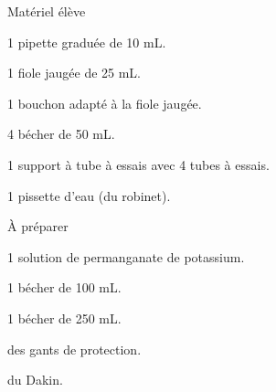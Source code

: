 
\begin{boiteMateriel}{Matériel élève}
  \effectifSeconde

  \begin{protocole}
    \item 1 pipette graduée de 10 mL.
    \item 1 fiole jaugée de 25 mL.
    \item 1 bouchon adapté à la fiole jaugée.
    \item 4 bécher de 50 mL.
    \item 1 support à tube à essais avec 4 tubes à essais.
    \item 1 pissette d'eau (du robinet).
  \end{protocole}
\end{boiteMateriel}


\begin{boiteMateriel}{À préparer}
  \begin{protocole}
    \item 1 solution de permanganate de potassium.
    \item 1 bécher de 100 mL.
    \item 1 bécher de 250 mL.
    \item des gants de protection.
    \item du Dakin.
  \end{protocole}
\end{boiteMateriel}